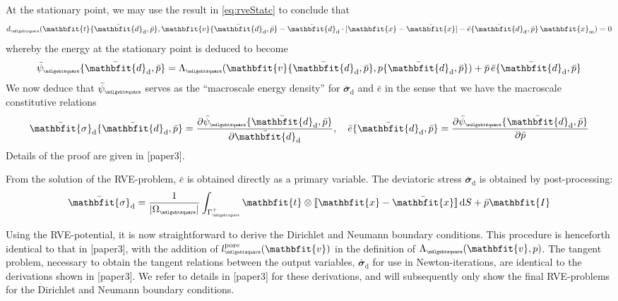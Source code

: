 \documentclass[12pt,a4paper]{article}
\renewcommand{\ta}[1]{\mathbfit{#1}}
\renewcommand{\ts}[1]{\mathbfit{#1}}
\renewcommand{\Box}{\mdlgwhtsquare}
\DeclarePairedDelimiter{\jmp}{[\![}{]\!]}
\renewcommand{\dev}{\mathrm{d}}
\newcommand{\volume}{|\Omega_\rve|}
\newcommand{\pore}{\mathrm{pore}}
\newcommand{\epspargs}{\{{\bar{\ts d}}_\dev, \bar{p}\}}
\newcommand{\rve}{
  {\mathchoice
   {\mbox{\scalebox{0.67}{$\Box$}}}
   {\mbox{\scalebox{0.67}{$\Box$}}}
   {\mbox{\scalebox{0.5}{$\Box$}}}
   {\mbox{\scalebox{0.375}{$\Box$}}}
  }
}
\begin{document}
At the stationary point, we may use the result in \cref{eq:rveStatc} to conclude that
\begin{equation}
    d_\rve(\ta{t}\epspargs,\ta v\epspargs-\bar{\ts d}_\dev\cdot[\ta{x}-\bar{\ta{x}}]-\bar{e}\epspargs\,\ta{x}_\mean) = 0
\label{eq86}
\end{equation}
whereby the energy at the stationary point is deduced to become
\begin{equation}
    \bar{\psi}_\rve\epspargs =
    \Lambda_\rve(\ta v\epspargs,p\epspargs) + \bar{p}\,\bar{e}\epspargs
\label{eq87}
\end{equation}
We now deduce that $\bar{\psi}_\rve$ serves as the ``macroscale energy density'' for $\bar{\ts\sigma}_\dev$ and $\bar{e}$ in the sense that we have the macroscale constitutive relations
\begin{equation}
    \bar{\ts\sigma}_\dev\epspargs = \frac{\partial \bar{\psi}_\rve\epspargs}{\partial \bar{\ts d}_\dev}, \quad
     \bar{e}\epspargs = \frac{\partial \bar{\psi}_\rve\epspargs}{\partial \bar{p}}
\label{eq88}
\end{equation}
Details of the proof are given in [paper3].

From the solution of the RVE-problem, $\bar{e}$ is obtained directly as a primary variable.
The deviatoric stress $\bar{\ts\sigma}_\dev$ is obtained by post-processing:
\begin{align}
 \bar{\ts\sigma}_\dev = \frac{1}{\volume} \int_{\Gamma_\rve^+} \ta t \outerp \jmp{\ta x - \bar{\ta x}}\dif S + \bar{p}\ts I
\label{eq:weak_periodic_sigma_dev}
\end{align}

Using the RVE-potential, it is now straightforward to derive the Dirichlet and Neumann boundary conditions.
This procedure is henceforth identical to that in [paper3], with the addition of $l_\rve^\pore(\ta v)$ in the definition of $\Lambda_\rve(\ta v,p)$.
The tangent problem, necessary to obtain the tangent relations between the output variables, $\bar{\ts\sigma}_\dev$ for use in Newton-iterations, are identical to the derivations shown in [paper3].
We refer to details in [paper3] for these derivations, and will subsequently only show the final RVE-problems for the Dirichlet and Neumann boundary conditions.
\end{document}
